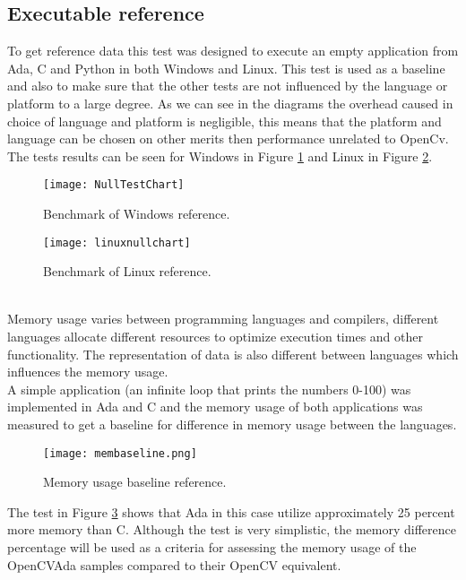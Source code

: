 \subsection{Executable reference}\label{sec:execref}
To get reference data this test was designed to execute an empty application from Ada, C and Python in both Windows and Linux. This test is used as a baseline and also to make sure that the other tests are not influenced by the language or platform to a large degree. As we can see in the diagrams the overhead caused in choice of language and platform is negligible, this means that the platform and language can be chosen on other merits then performance unrelated to OpenCv. The tests results can be seen for Windows in Figure \ref{fig:NullTestChart} and Linux in Figure \ref{fig:linuxnullchart}.
\begin{figure}
\centering
\texttt{[image: NullTestChart]}
\caption{Benchmark of Windows reference.}
\label{fig:NullTestChart}
\end{figure}
\begin{figure}
\centering
\texttt{[image: linuxnullchart]}
\caption{Benchmark of Linux reference.}
\label{fig:linuxnullchart}
\end{figure}
\\
Memory usage varies between programming languages and compilers, different languages allocate different resources to optimize execution times and other functionality. The representation of data is also different between languages which influences the memory usage.
\\
A simple application (an infinite loop that prints the numbers 0-100) was implemented in Ada and C and the memory usage of both applications was measured to get a baseline for difference in memory usage between the languages.
\\
\begin{figure}
\centering
\texttt{[image: membaseline.png]}
\caption{Memory usage baseline reference.}
\label{fig:membaseline}
\end{figure}
The test in Figure \ref{fig:membaseline} shows that Ada in this case utilize approximately 25 percent more memory than C. Although the test is very simplistic, the memory difference percentage will be used as a criteria for assessing the memory usage of the OpenCVAda samples compared to their OpenCV equivalent.
